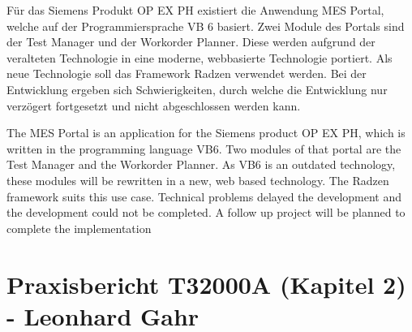 \documentclass[
ngerman, %
a4paper, %
12pt,
pdftex,
disable %
]{report}
\newenvironment{abstractpage}
{\cleardoublepage\vspace*{\fill}\thispagestyle{empty}}
{\vfill\cleardoublepage}
\newenvironment{myabstract}[1]
{\bigskip\selectlanguage{#1}
\begin{center}
    \bfseries\abstractname
\end{center}}
{\par\bigskip}
\begin{document}
\begin{abstractpage}
  \begin{myabstract}{german}
    Für das Siemens Produkt \gls{OP EX PH} existiert die Anwendung MES Portal, welche auf der Programmiersprache \gls{VB} 6 basiert. Zwei Module des Portals sind der Test Manager und der Workorder Planner. Diese werden aufgrund der veralteten Technologie in eine moderne, webbasierte Technologie portiert. Als neue Technologie soll das Framework Radzen verwendet werden. Bei der Entwicklung ergeben sich Schwierigkeiten, durch welche die Entwicklung nur verzögert fortgesetzt und nicht abgeschlossen werden kann.
  \end{myabstract}

  \begin{myabstract}{english}
    The MES Portal is an application for the Siemens product \gls{OP EX PH}, which is written in the programming language \gls{VB}6. Two modules of that portal are the Test Manager and the Workorder Planner. As \gls{VB}6 is an outdated technology, these modules will be rewritten in a new, web based technology. The Radzen framework suits this use case. Technical problems delayed the development and the development could not be completed. A follow up project will be planned to complete the implementation
  \end{myabstract}
\end{abstractpage}

\tableofcontents
\listoftables
\listoffigures
\lstlistoflistings

\printnoidxglossary[type=main, title={Glossar}]
\printnoidxglossary[type=\acronymtype, title={Abkürzungsverzeichnis}]








\clearpage
\appendix
\chapter{Praxisbericht T3\textunderscore 2000A (Kapitel 2) - Leonhard Gahr}\label{appendix_T2000_gahr}
%
\clearpage

\cleardoublepage{}
\def\refname{Literaturverzeichnis}
\printbibliography

\newpage
\listoftodos
\end{document}
